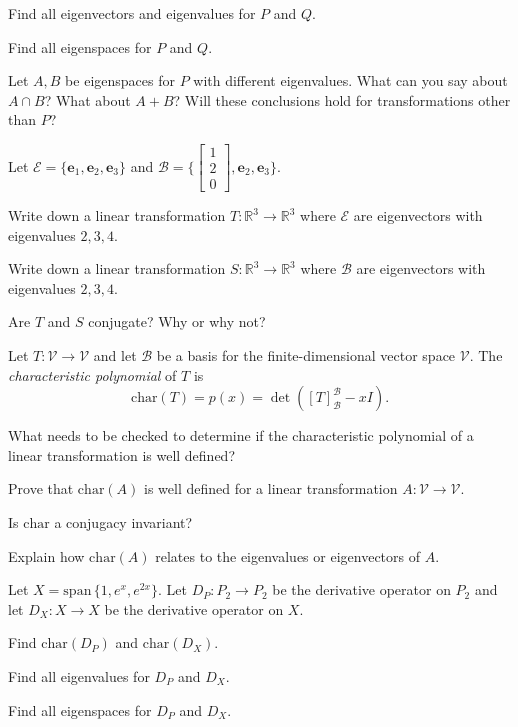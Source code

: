 \documentclass[14pt]{problemset}
\newcommand{\xh}{{{\mathbf e}_1}}
\newcommand{\yh}{{{\mathbf e}_2}}
\newcommand{\zh}{{{\mathbf e}_3}}
\newcommand{\R}{\mathbb{R}}
\newcommand{\Span}{\mathrm{span}\,}
\newcommand{\mat}[1]{\begin{bmatrix}#1\end{bmatrix}}
\newcommand{\Char}{\mathrm{char}}
\begin{document}
	\begin{parts}
		\item Find all eigenvectors and eigenvalues for $P$ and $Q$.
		\item Find all eigenspaces for $P$ and $Q$.
		\item Let $A,B$ be eigenspaces for $P$ with different eigenvalues.
			What can you say about $A\cap B$? What about $A+B$? Will
			these conclusions hold for transformations other than $P$?
	\end{parts}

	\newpage
	\question
	Let $\mathscr E=\{\xh,\yh,\zh\}$ and $\mathscr B=\{\mat{1\\2\\0},\yh,\zh\}$.
	\begin{parts}
		\item Write down a linear transformation $T:\R^3\to\R^3$ where $\mathscr E$ are eigenvectors
			with eigenvalues $2,3,4$.
		\item Write down a linear transformation $S:\R^3\to\R^3$ where $\mathscr B$ are eigenvectors
			with eigenvalues $2,3,4$.
		\item Are $T$ and $S$ conjugate? Why or why not?
	\end{parts}

	\begin{definition}
		Let $T:\mathcal V\to\mathcal V$ and let $\mathscr B$ be a basis for 
		the finite-dimensional vector space $\mathcal V$. The \emph{characteristic
		polynomial} of $T$ is 
		\[
			\Char(T) = p(x) =\det([T]_{\mathscr B}^{\mathscr B} - xI).
		\]
	\end{definition}

	\question
	\begin{parts}
		\item What needs to be checked to determine if the characteristic polynomial
			of a linear transformation is well defined?
		\item Prove that $\Char(A)$ is well defined for a linear transformation $A:\mathcal V\to\mathcal V$.
		\item Is $\Char$ a conjugacy invariant?
		\item Explain how $\Char(A)$ relates to the eigenvalues or eigenvectors of $A$.
	\end{parts}

	\question
	Let $X=\Span\{1,e^x,e^{2x}\}$.
	Let $D_P:P_2\to P_2$ be the derivative operator on $P_2$ and let $D_X:X\to X$ be the derivative
	operator on $X$.
	\begin{parts}
		\item Find $\Char(D_P)$ and $\Char(D_X)$.
		\item Find all eigenvalues for $D_P$ and $D_X$.
		\item Find all eigenspaces for $D_P$ and $D_X$.
	\end{parts}
\end{document}
